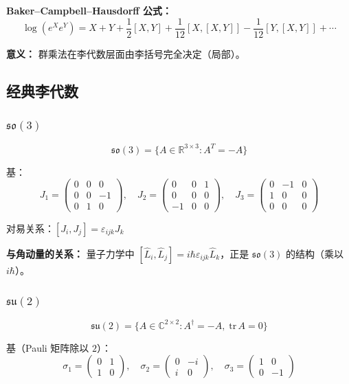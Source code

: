 \textbf{Baker--Campbell--Hausdorff 公式：}
\[
\log(e^X e^Y) = X + Y + \frac{1}{2}[X,Y] + \frac{1}{12}[X,[X,Y]] - \frac{1}{12}[Y,[X,Y]] + \cdots
\]

\textbf{意义：} 群乘法在李代数层面由李括号完全决定（局部）。

\subsection{经典李代数}

\subsubsection{$\mathfrak{so}(3)$}

\[
\mathfrak{so}(3) = \{A \in \mathbb{R}^{3\times 3} : A^T = -A\}
\]

基：
\[
J_1 = \begin{pmatrix} 0&0&0\\0&0&-1\\0&1&0 \end{pmatrix}, \quad
J_2 = \begin{pmatrix} 0&0&1\\0&0&0\\-1&0&0 \end{pmatrix}, \quad
J_3 = \begin{pmatrix} 0&-1&0\\1&0&0\\0&0&0 \end{pmatrix}
\]

对易关系：$[J_i, J_j] = \varepsilon_{ijk}J_k$

\textbf{与角动量的关系：} 量子力学中 $[\hat{L}_i, \hat{L}_j] = i\hbar\varepsilon_{ijk}\hat{L}_k$，正是 $\mathfrak{so}(3)$ 的结构（乘以 $i\hbar$）。

\subsubsection{$\mathfrak{su}(2)$}

\[
\mathfrak{su}(2) = \{A \in \mathbb{C}^{2\times 2} : A^\dagger = -A,\; \text{tr}\,A = 0\}
\]

基（Pauli 矩阵除以 $2$）：
\[
\sigma_1 = \begin{pmatrix}0&1\\1&0\end{pmatrix}, \quad
\sigma_2 = \begin{pmatrix}0&-i\\i&0\end{pmatrix}, \quad
\sigma_3 = \begin{pmatrix}1&0\\0&-1\end{pmatrix}
\]

